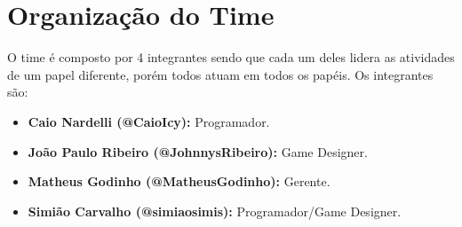 \section{Organização do Time}

O time é composto por 4 integrantes sendo que cada um deles lidera as atividades de um papel diferente, porém todos atuam em todos os papéis. Os integrantes são:

\begin{itemize}
\item\textbf{Caio Nardelli (@CaioIcy):} Programador. 
\item\textbf{João Paulo Ribeiro (@JohnnysRibeiro):} Game Designer.
\item\textbf{Matheus Godinho (@MatheusGodinho):} Gerente.
\item\textbf{Simião Carvalho (@simiaosimis):} Programador/Game Designer.
\end{itemize}

